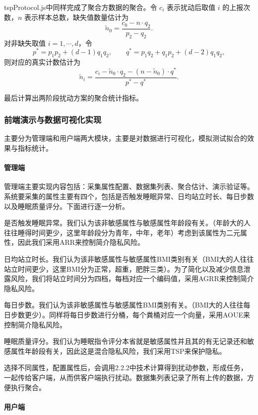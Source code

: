 \documentclass{cumcmthesis}
\numberwithin{equation}{section}
\numberwithin{figure}{section}
\numberwithin{table}{section}
\begin{document}
tspProtocol.js中同样完成了聚合方数据的聚合。令 \(c_i\) 表示扰动后取值 \(i\) 的上报次数，\(n\) 表示样本总数，缺失值数量估计为
\[
\tilde{n}_0=\frac{c_0-n\cdot q_2}{p_2-q_2}.
\]
对非缺失取值 \(i=1,\cdots,d\)，令
\[
p^{*}=p_1p_2+(d-1)q_1q_2,
\qquad
q^{*}=p_1q_2+q_1p_2+(d-2)q_1q_2,
\]
则对应的真实计数估计为
\[
\tilde{n}_i=\frac{c_i-\tilde{n}_0\cdot q_2-(n-\tilde{n}_0)\cdot q^{*}}{p^{*}-q^{*}}.
\]

最后计算出两阶段扰动方案的聚合统计指标。

\subsubsection{前端演示与数据可视化实现}

主要分为管理端和用户端两大模块，主要是对数据进行可视化，模拟测试拟合的效果与指标统计。

\paragraph{管理端}

管理端主要实现内容包括：采集属性配置、数据集列表、聚合估计、演示验证等。系统要采集的属性主要有四个，包括是否触发睡眠异常、日均站立时长、每日步数以及睡眠质量评分。下面进行逐一分析。

是否触发睡眠异常。我们认为该非敏感属性与敏感属性年龄段有关。（年龄大的人往往睡得时间更少，这里年龄段分为青年，中年，老年）考虑到该属性为二元属性，因此我们采用ARR来控制简介隐私风险。

日均站立时长。我们认为该非敏感属性与敏感属性BMI类别有关（BMI大的人往往站立时间更少，这里BMI分为正常，超重，肥胖三类）。为了简化以及减少信息泄露风险，我们将站立时间分为四档，每档对应一个编码值，采用AGRR来控制简介隐私风险。

每日步数。我们认为该非敏感属性与敏感属性BMI类别有关。（BMI大的人往往每日步数更少）。同样将每日步数进行分桶，每个粪桶对应一个向量，采用AOUE来控制简介隐私风险。

睡眠质量评分。我们认为睡眠指令评分本省就是敏感属性并且其的有无记录还和敏感属性年龄段有关，因此这是混合隐私风险，我们采用TSP来保护隐私。

选择不同属性，配置属性后，会调用2.2.2中技术计算得到扰动参数，形成任务，一起传给客户端，从而供客户端执行扰动。数据集列表记录了所有上传的数据，方便执行聚合。

\paragraph{用户端}
\end{document}

